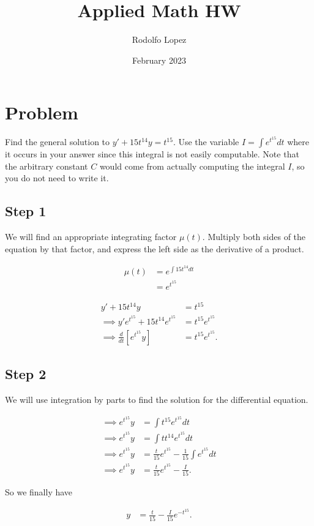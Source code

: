 \documentclass{article}
\title{Applied Math HW}
\author{Rodolfo Lopez}
\date{February 2023}
\begin{document}
\maketitle

\section{Problem}
Find the general solution to $y' + 15t^{14}y = t^{15}.$
Use the variable $I = \int e^{t^{15}}dt$ where it occurs in your answer since this integral is not easily computable. Note that the arbitrary constant $C$ would come from actually computing the integral $I$, so you do not need to write it. 

\subsection{Step 1}
We will find an appropriate integrating factor $\mu(t)$. Multiply both sides of the equation by that factor, and express the left side as the derivative of a product. 


\begin{align} 
    \mu(t) 
    &= e^{\int15t^{14}dt} \\
    &= e^{t^{15}} 
\end{align}


\begin{align}
    y' + 15t^{14}y &= t^{15}  \\
    \implies y'e^{t^{15}} + 15t^{14}e^{t^{15}} &= t^{15}e^{t^{15}} \\
    \implies \frac{d}{dt}[e^{t^{15}}y] &= t^{15}e^{t^{15}}.
\end{align}

\subsection{Step 2}
We will use integration by parts to find the solution for the differential equation.

\begin{align}
    \implies e^{t^{15}}y &= \int t^{15}e^{t^{15}}dt\\
    \implies e^{t^{15}}y &= \int t t^{14} e^{t^{15}} dt\\
    \implies e^{t^{15}}y &= \frac{t}{15}e^{t^{15}}-\frac{1}{15}\int e^{t^{15}} dt\\
    \implies e^{t^{15}}y &= \frac{t}{15}e^{t^{15}} - \frac{I}{15}.
\end{align}

So we finally have

\begin{align}
    y &= \frac{t}{15} - \frac{I}{15}e^{-t^{15}}.
\end{align}
\end{document}
